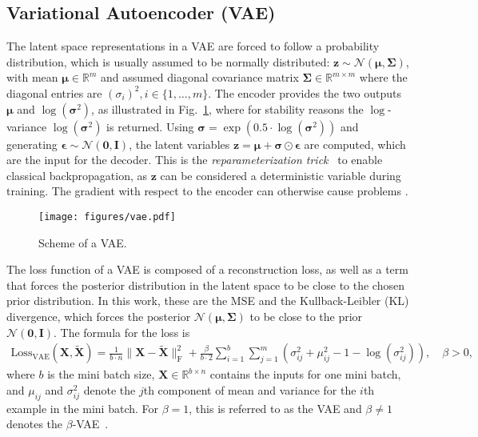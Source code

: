\subsection{Variational Autoencoder (VAE)}
The latent space representations in a VAE are forced to follow a probability distribution, which is usually assumed to be normally distributed: $\mathbf{z}\sim \mathcal{N}(\boldsymbol{\mu},\boldsymbol{\Sigma})$, with mean $\boldsymbol{\mu}\in \mathbb{R}^m$ 
and assumed diagonal covariance matrix $\boldsymbol{\Sigma}\in\mathbb{R}^{m\times m}$ where the diagonal entries are $(\sigma_i)^2, i\in \{1,\dots,m\}$. 
 The encoder provides the two outputs $\boldsymbol{\mu}$ and 
$\log (\boldsymbol{\sigma}^2)$, as illustrated in Fig.~\ref{fig:vae}, 
where for stability reasons the $\log$-variance $\log (\boldsymbol{\sigma}^2)$ is returned. 
Using $\boldsymbol{\sigma} = \exp(0.5\cdot\log (\boldsymbol{\sigma}^2))$ and  generating $\boldsymbol{\epsilon} \sim \mathcal{N}(\mathbf{0},\mathbf{I})$, the latent variables $\mathbf{z} = \boldsymbol{\mu} + \boldsymbol{\sigma} \odot \boldsymbol{\epsilon}$ are computed, which are the input for the decoder. This is the \emph{reparameterization trick}~\cite{Kingma:2013} to enable classical backpropagation, as $\mathbf{z}$ can be considered a deterministic variable during training. The gradient with respect to the encoder can otherwise cause problems \cite{Kingma:2013}.
\begin{figure}[!h]
     \centering
    \texttt{[image: figures/vae.pdf]}
    \caption{Scheme of a VAE.}
    \label{fig:vae}
\end{figure}
The loss function of a VAE is composed of a reconstruction loss, as well as a term that forces the posterior distribution in the latent space to be close to the chosen prior distribution. In this work, these are the MSE and the Kullback-Leibler (KL) divergence, which forces the posterior $\mathcal{N}(\boldsymbol{\mu},\boldsymbol{\Sigma})$ to be close to the prior $\mathcal{N}(\mathbf{0},\mathbf{I})$. The formula for the loss is
\begin{align}
    \mathrm{Loss_{VAE}}(\mathbf{X},\tilde{\mathbf{X}}) 
     =\frac{1}{b\cdot n}\lVert \mathbf{X} - \tilde{\mathbf{X}} \rVert^2_\mathrm{F} + \frac{\beta}{b\cdot 2}\sum_{i=1}^b\sum_{j=1}^m (\sigma_{ij}^2+\mu_{ij}^2 - 1 - \log(\sigma_{ij}^2)), \quad \beta>0,
    \label{eq:vae_loss}
\end{align}
where $b$ is the mini batch size, $\mathbf{X}\in \mathbb{R}^{b\times n}$ contains the inputs for one mini batch, and $\mu_{ij}$ and $\sigma^2_{ij}$ denote the $j$th component of mean and variance for the $i$th example in the mini batch. 
For $\beta= 1$, this is referred to as the VAE \cite{Kingma:2013} and $\beta\neq 1$ denotes the $\beta$-VAE~\cite{Higgins2016betaVAELB}.


